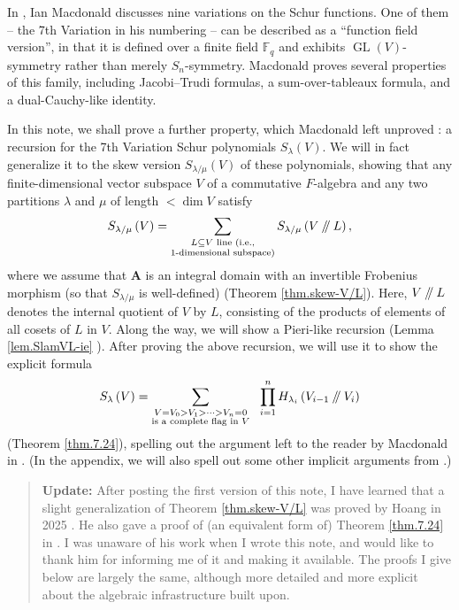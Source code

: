 \documentclass[numbers=enddot,12pt,final,onecolumn,notitlepage]{scrartcl}%
\numberwithin{exer}{section}
\theoremstyle{definition}
\newenvironment{statement}{\begin{quote}}{\end{quote}}
\let\sumnonlimits\sum
\let\prodnonlimits\prod
\renewcommand{\sum}{\sumnonlimits\limits}
\renewcommand{\prod}{\prodnonlimits\limits}
\newcommand{\sslash}{\mathbin{/\mkern-5mu/}}
\theoremstyle{plainsl}
\begin{document}
In \cite{Macdon92}, Ian Macdonald discusses nine variations on the Schur
functions. One of them -- the 7th Variation in his numbering -- can be
described as a \textquotedblleft function field version\textquotedblright, in
that it is defined over a finite field $\mathbb{F}_{q}$ and exhibits
$\operatorname*{GL}\left(  V\right)  $-symmetry rather than merely $S_{n}%
$-symmetry. Macdonald proves several properties of this family, including
Jacobi--Trudi formulas, a sum-over-tableaux formula, and a dual-Cauchy-like identity.

In this note, we shall prove a further property, which Macdonald left unproved
\cite[(7.25 ?)]{Macdon92}: a recursion for the 7th Variation Schur polynomials
$S_{\lambda}\left(  V\right)  $. We will in fact generalize it to the skew
version $S_{\lambda/\mu}\left(  V\right)  $ of these polynomials, showing that
any finite-dimensional vector subspace $V$ of a commutative $F$-algebra and
any two partitions $\lambda$ and $\mu$ of length $<\dim V$ satisfy%
\[
S_{\lambda/\mu}\left(  V\right)  =\sum_{\substack{L\subseteq V\text{ line
(i.e.,}\\1\text{-dimensional subspace)}}}S_{\lambda/\mu}\left(  V\sslash
L\right)  ,
\]
where we assume that $\mathbf{A}$ is an integral domain with an invertible
Frobenius morphism (so that $S_{\lambda/\mu}$ is well-defined) (Theorem
\ref{thm.skew-V/L}). Here, $V\sslash L$ denotes the internal quotient of $V$
by $L$, consisting of the products of elements of all cosets of $L$ in $V$.
Along the way, we will show a Pieri-like recursion (Lemma \ref{lem.SlamVL-ie}%
). After proving the above recursion, we will use it to show the explicit
formula%
\[
S_{\lambda}\left(  V\right)  =\sum_{\substack{V=V_{0}>V_{1}>\cdots
>V_{n}=0\\\text{is a complete flag in }V}}\ \ \prod_{i=1}^{n}H_{\lambda_{i}%
}\left(  V_{i-1}\sslash V_{i}\right)
\]
(Theorem \ref{thm.7.24}), spelling out the argument left to the reader by
Macdonald in \cite{Macdon92}. (In the appendix, we will also spell out some
other implicit arguments from \cite{Macdon92}.)

\begin{statement}
\textbf{Update:} After posting the first version of this note, I have learned
that a slight generalization of Theorem \ref{thm.skew-V/L} was proved by Hoang
in 2025 \cite[Theorem 1.24]{Hoang25}. He also gave a proof of (an equivalent
form of) Theorem \ref{thm.7.24} in \cite[Theorem 1.26]{Hoang25}. I was unaware
of his work when I wrote this note, and would like to thank him for informing
me of it and making it available. The proofs I give below are largely the
same, although more detailed and more explicit about the algebraic
infrastructure built upon.
\end{statement}
\end{document}
